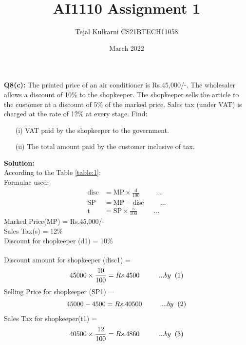 \documentclass[12pt, twocolumn]{article}
\title{AI1110 Assignment 1}
\author{Tejal Kulkarni CS21BTECH11058}
\date{March 2022}
\begin{document}
\maketitle
\textbf{Q8(c):} The printed price of an air conditioner is  Rs.45,000/-. The wholesaler allows a discount of 10\% to the shopkeeper. The shopkeeper sells the article to the customer at a discount of 5\% of the marked price. Sales tax (under VAT) is charged at the rate of 12\% at every stage. Find:
\begin{enumerate}
\item[(i)]VAT paid by the shopkeeper to the government.
\item[(ii)]The total amount paid by the customer inclusive of tax. 
\end{enumerate}
\textbf{Solution:}\\
According to the Table \ref{table:1}:\\
Formulae used:
\begin{align}
  \text{disc} &= \text{MP}\times\frac{\text{d}}{100}\hspace{1cm}...\\ 
  \text{SP} &= \text{MP} - \text{disc} \hspace{1cm}...\\ 
  \text{t} &= \text{SP}\times\frac{\text{s}}{100}\hspace{1cm}...
\end{align}
Marked  Price(MP) = Rs.45,000/- \\
Sales  Tax(s) = 12\% \\
Discount  for  shopkeeper (d1) = 10\% \\ \\
Discount  amount for shopkeeper (disc1) =  \begin{equation*}
    45000\times\frac{10}{100} = Rs.4500 \hspace{1cm}... by \hspace{0.2cm} (1) 
    \end{equation*} 
Selling Price for shopkeeper (SP1) = \begin{equation*}
    45000 - 4500 = Rs.40500 \hspace{1cm}... by \hspace{0.2cm} (2)
\end{equation*}
Sales Tax for shopkeeper(t1) = \begin{equation*} 
    40500\times\frac{12}{100} =  Rs.4860 \hspace{1cm}... by \hspace{0.2cm} (3)
\end{equation*}
\end{document}
